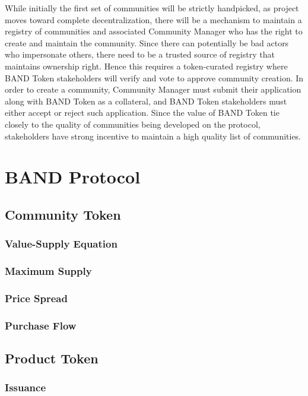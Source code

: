 \documentclass[letterpaper,11pt]{article}
\begin{document}
While initially the first set of communities will be strictly handpicked, as project moves toward complete decentralization, there will be a mechanism to maintain a registry of communities and associated Community Manager who has the right to create and maintain the community. Since there can potentially be bad actors who impersonate others, there need to be a trusted source of registry that maintains ownership right. Hence this requires a token-curated registry where BAND Token stakeholders will verify and vote to approve community creation. In order to create a community, Community Manager must submit their application along with BAND Token as a collateral, and BAND Token stakeholders must either accept or reject such application. Since the value of BAND Token tie closely to the quality of communities being developed on the protocol, stakeholders have strong incentive to maintain a high quality list of communities.

\newpage
\section{BAND Protocol}

\subsection{Community Token}

\subsubsection{Value-Supply Equation}

\subsubsection{Maximum Supply}

\subsubsection{Price Spread}

\subsubsection{Purchase Flow}

\subsection{Product Token}

\subsubsection{Issuance}
\end{document}
